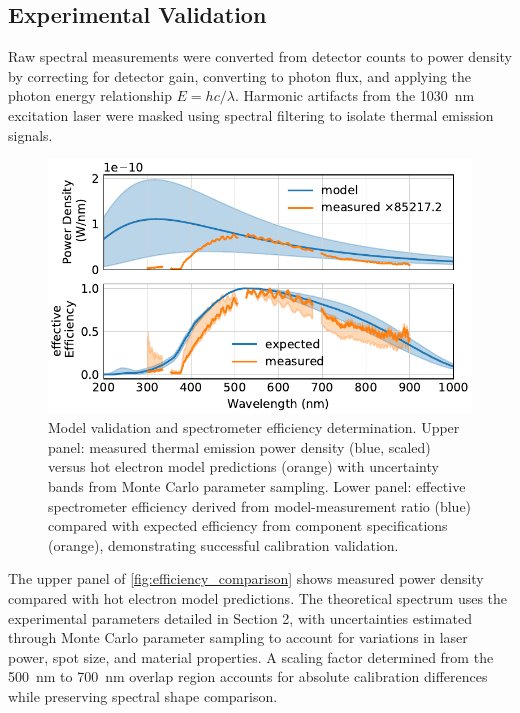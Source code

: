 \documentclass[
	parskip=half,
	a4paper,
]{scrarticle}
\begin{document}
\subsection{Experimental Validation}
Raw spectral measurements were converted from detector counts to power density by correcting for detector gain, converting to photon flux, and applying the photon energy relationship $E = hc/\lambda$. Harmonic artifacts from the \SI{1030}{nm} excitation laser were masked using spectral filtering to isolate thermal emission signals.

\begin{figure}
    \centering
    \includegraphics{../analysis/figures/efficiency de.pdf}
    \caption{Model validation and spectrometer efficiency determination. Upper panel: measured thermal emission power density (blue, scaled) versus hot electron model predictions (orange) with uncertainty bands from Monte Carlo parameter sampling. Lower panel: effective spectrometer efficiency derived from model-measurement ratio (blue) compared with expected efficiency from component specifications (orange), demonstrating successful calibration validation.}
    \label{fig:efficiency_comparison}
\end{figure}

The upper panel of \autoref{fig:efficiency_comparison} shows measured power density compared with hot electron model predictions. The theoretical spectrum uses the experimental parameters detailed in Section 2, with uncertainties estimated through Monte Carlo parameter sampling to account for variations in laser power, spot size, and material properties. A scaling factor determined from the \SI{500}{\nm} to \SI{700}{\nm} overlap region accounts for absolute calibration differences while preserving spectral shape comparison.
\end{document}
